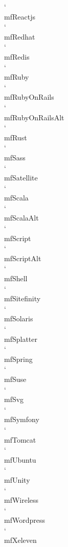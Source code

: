 \documentclass[parskip=half, twocolumn, 13pt]{scrartcl}
\begin{document}
\mfReactjs \quad \char`\\mfReactjs \\
\mfRedhat \quad \char`\\mfRedhat \\
\mfRedis \quad \char`\\mfRedis \\
\mfRuby \quad \char`\\mfRuby \\
\mfRubyOnRails \quad \char`\\mfRubyOnRails \\
\mfRubyOnRailsAlt \quad \char`\\mfRubyOnRailsAlt \\
\mfRust \quad \char`\\mfRust \\
\mfSass \quad \char`\\mfSass \\
\mfSatellite \quad \char`\\mfSatellite \\
\mfScala \quad \char`\\mfScala \\
\mfScalaAlt \quad \char`\\mfScalaAlt \\
\mfScript \quad \char`\\mfScript \\
\mfScriptAlt \quad \char`\\mfScriptAlt \\
\mfShell \quad \char`\\mfShell \\
\mfSitefinity \quad \char`\\mfSitefinity \\
\mfSolaris \quad \char`\\mfSolaris \\
\mfSplatter \quad \char`\\mfSplatter \\
\mfSpring \quad \char`\\mfSpring \\
\mfSuse \quad \char`\\mfSuse \\
\mfSvg \quad \char`\\mfSvg \\
\mfSymfony \quad \char`\\mfSymfony \\
\mfTomcat \quad \char`\\mfTomcat \\
\mfUbuntu \quad \char`\\mfUbuntu \\
\mfUnity \quad \char`\\mfUnity \\
\mfWireless \quad \char`\\mfWireless \\
\mfWordpress \quad \char`\\mfWordpress \\
\mfXeleven \quad \char`\\mfXeleven \\
\end{document}
